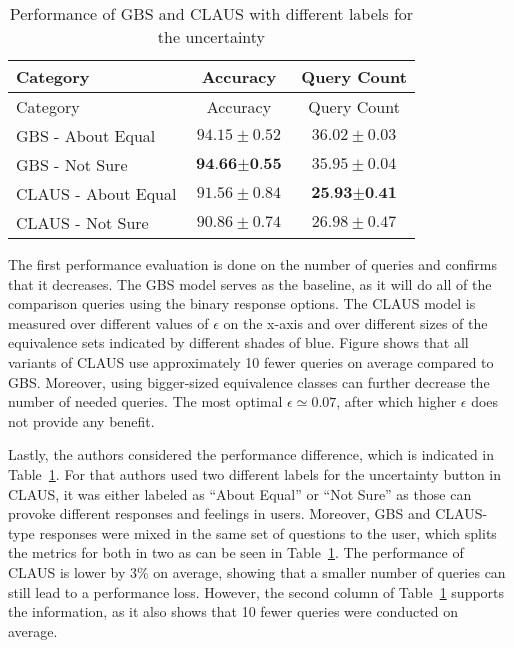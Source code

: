\documentclass[
  letterpaper,
  numbers=noenddot,
  DIV=11]{scrreprt}
\theoremstyle{plain}
\theoremstyle{definition}
\theoremstyle{remark}
\begin{document}
\begin{longtable}[]{@{}lcc@{}}
\caption{Performance of GBS and CLAUS with different labels for the
uncertainty}\label{tbl-claus_tab}\tabularnewline
\toprule\noalign{}
Category & Accuracy & Query Count \\
\midrule\noalign{}
\endfirsthead
\toprule\noalign{}
Category & Accuracy & Query Count \\
\midrule\noalign{}
\endhead
\bottomrule\noalign{}
\endlastfoot
GBS - About Equal & \(94.15 \pm 0.52\) & \(36.02 \pm 0.03\) \\
GBS - Not Sure & \(\textbf{94.66} \pm \textbf{0.55}\) &
\(35.95 \pm 0.04\) \\
CLAUS - About Equal & \(91.56 \pm 0.84\) &
\(\textbf{25.93} \pm \textbf{0.41}\) \\
CLAUS - Not Sure & \(90.86 \pm 0.74\) & \(26.98 \pm 0.47\) \\
\end{longtable}

The first performance evaluation is done on the number of queries and
confirms that it decreases. The GBS model serves as the baseline, as it
will do all of the comparison queries using the binary response options.
The CLAUS model is measured over different values of \(\epsilon\) on the
x-axis and over different sizes of the equivalence sets indicated by
different shades of blue. Figure shows that all variants of CLAUS use
approximately 10 fewer queries on average compared to GBS. Moreover,
using bigger-sized equivalence classes can further decrease the number
of needed queries. The most optimal \(\epsilon \simeq 0.07\), after
which higher \(\epsilon\) does not provide any benefit.

Lastly, the authors considered the performance difference, which is
indicated in Table~\ref{tbl-claus_tab}. For that authors used two
different labels for the uncertainty button in CLAUS, it was either
labeled as ``About Equal'' or ``Not Sure'' as those can provoke
different responses and feelings in users. Moreover, GBS and CLAUS-type
responses were mixed in the same set of questions to the user, which
splits the metrics for both in two as can be seen in
Table~\ref{tbl-claus_tab}. The performance of CLAUS is lower by \(3\%\)
on average, showing that a smaller number of queries can still lead to a
performance loss. However, the second column of
Table~\ref{tbl-claus_tab} supports the information, as it also shows
that 10 fewer queries were conducted on average.
\end{document}
